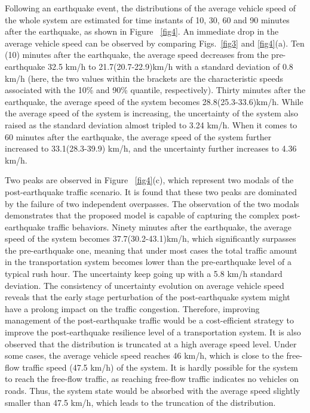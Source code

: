 \documentclass[review,11pt,nonatbib]{elsarticle}
\begin{document}
\par Following an earthquake event, the distributions of the average vehicle speed of the whole system are estimated for time instants of 10, 30, 60 and 90 minutes after the earthquake, as shown in Figure ~\ref{fig4}. An immediate drop in the average vehicle speed can be observed by comparing Figs.~\ref{fig3} and \ref{fig4}(a). Ten (10) minutes after the earthquake, the average speed decreases from the pre-earthquake 32.5 km/h to 21.7(20.7-22.9)km/h with a standard deviation of 0.8 km/h (here, the two values within the brackets are the characteristic speeds associated with the 10\% and 90\% quantile, respectively). Thirty minutes after the earthquake, the average speed of the system becomes 28.8(25.3-33.6)km/h. While the average speed of the system is increasing, the uncertainty of the system also raised as the standard deviation almost tripled to 3.24 km/h. When it comes to 60 minutes after the earthquake, the average speed of the system further increased to 33.1(28.3-39.9) km/h, and the uncertainty further increases to 4.36 km/h. 

Two peaks are observed in Figure ~\ref{fig4}(c), which represent two modals of the post-earthquake traffic scenario. It is found that these two peaks are dominated by the failure of two independent overpasses. The observation of the two modals demonstrates that the proposed model is capable of capturing the complex post-earthquake traffic behaviors. Ninety minutes after the earthquake, the average speed of the system becomes 37.7(30.2-43.1)km/h, which significantly surpasses the pre-earthquake one, meaning that under most cases the total traffic amount in the transportation system becomes lower than the pre-earthquake level of a typical rush hour. The uncertainty keep going up with a 5.8 km/h standard deviation. The consistency of uncertainty evolution on average vehicle speed reveals that the early stage perturbation of the post-earthquake system might have a prolong impact on the traffic congestion. Therefore, improving management of the post-earthquake traffic would be a cost-efficient strategy to improve the post-earthquake resilience level of a transportation system. It is also observed that the distribution is truncated at a high average speed level. Under some cases, the average vehicle speed reaches 46 km/h, which is close to the free-flow traffic speed (47.5 km/h) of the system. It is hardly possible for the system to reach the free-flow traffic, as reaching free-flow traffic indicates no vehicles on roads. Thus, the system state would be absorbed with the average speed slightly smaller than 47.5 km/h, which leads to the truncation of the distribution.
\end{document}
